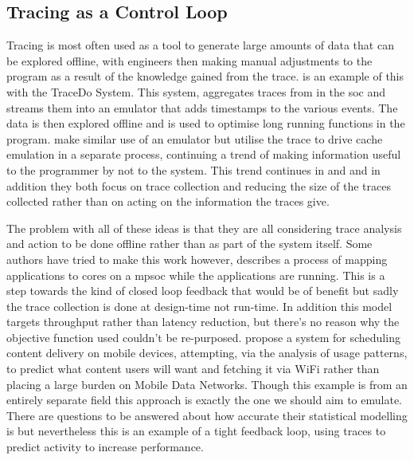 \subsection{Tracing as a Control Loop}

Tracing is most often used as a tool to generate large amounts of data that can be explored offline, with engineers then making manual adjustments to the program as a result of the knowledge gained from the trace. \citet{huApplicationsOnchipTrace2007} is an example of this with the TraceDo System. This system, aggregates traces from  in the \gls{soc} and streams them into an emulator that adds timestamps to the various events. The data is then explored offline and is used to optimise long running functions in the program. \citet{wangRealTimeCache2013} make similar use of an emulator but utilise the trace to drive cache emulation in a separate process, continuing a trend of making information useful to the programmer by not to the system. This trend continues in \citet{liTracebasedAnalysisMethodology2016} and \citet{mertzPracticalFeasibilitySoftware2019} and in addition they both focus on trace collection and reducing the size of the traces collected rather than on acting on the information the traces give.

The problem with all of these ideas is that they are all considering trace analysis and action to be done offline rather than as part of the system itself. Some authors have tried to make this work however, \citet{singhResourceThroughputAware2016} describes a process of mapping applications to cores on a \gls{mpsoc} while the applications are running. This is a step towards the kind of closed loop feedback that would be of benefit but sadly the trace collection is done at design-time not run-time. In addition this model targets throughput rather than latency reduction, but there's no reason why the objective function used couldn't be re-purposed. \citet{shoukryProactiveSchedulingContent2014} propose a system for scheduling content delivery on mobile devices, attempting, via the analysis of usage patterns, to predict what content users will want and fetching it via WiFi rather than placing a large burden on Mobile Data Networks. Though this example is from an entirely separate field this approach is exactly the one we should aim to emulate. There are questions to be answered about how accurate their statistical modelling is but nevertheless this is an example of a tight feedback loop, using traces to predict activity to increase performance. 

